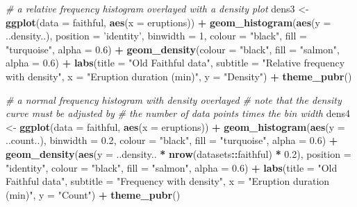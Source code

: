 \documentclass[english,10pt,a4paper,oneside]{book}
\newenvironment{Shaded}{\begin{snugshade}}{\end{snugshade}}
\newcommand{\CommentTok}[1]{\textcolor[rgb]{0.56,0.35,0.01}{\textit{#1}}}
\newcommand{\DataTypeTok}[1]{\textcolor[rgb]{0.13,0.29,0.53}{#1}}
\newcommand{\DecValTok}[1]{\textcolor[rgb]{0.00,0.00,0.81}{#1}}
\newcommand{\FloatTok}[1]{\textcolor[rgb]{0.00,0.00,0.81}{#1}}
\newcommand{\KeywordTok}[1]{\textcolor[rgb]{0.13,0.29,0.53}{\textbf{#1}}}
\newcommand{\NormalTok}[1]{#1}
\newcommand{\OperatorTok}[1]{\textcolor[rgb]{0.81,0.36,0.00}{\textbf{#1}}}
\newcommand{\StringTok}[1]{\textcolor[rgb]{0.31,0.60,0.02}{#1}}
\theoremstyle{definition}
\theoremstyle{definition}
\theoremstyle{definition}
\theoremstyle{remark}
\begin{document}
\begin{Shaded}
\begin{Highlighting}[]
\CommentTok{# a relative frequency histogram overlayed with a density plot}
\NormalTok{dens3 <-}\StringTok{ }\KeywordTok{ggplot}\NormalTok{(}\DataTypeTok{data =}\NormalTok{ faithful, }\KeywordTok{aes}\NormalTok{(}\DataTypeTok{x =}\NormalTok{ eruptions)) }\OperatorTok{+}
\StringTok{  }\KeywordTok{geom_histogram}\NormalTok{(}\KeywordTok{aes}\NormalTok{(}\DataTypeTok{y =}\NormalTok{ ..density..),}
                 \DataTypeTok{position =} \StringTok{'identity'}\NormalTok{, }\DataTypeTok{binwidth =} \DecValTok{1}\NormalTok{,}
                 \DataTypeTok{colour =} \StringTok{"black"}\NormalTok{, }\DataTypeTok{fill =} \StringTok{"turquoise"}\NormalTok{, }\DataTypeTok{alpha =} \FloatTok{0.6}\NormalTok{) }\OperatorTok{+}
\StringTok{  }\KeywordTok{geom_density}\NormalTok{(}\DataTypeTok{colour =} \StringTok{"black"}\NormalTok{, }\DataTypeTok{fill =} \StringTok{"salmon"}\NormalTok{, }\DataTypeTok{alpha =} \FloatTok{0.6}\NormalTok{) }\OperatorTok{+}
\StringTok{  }\KeywordTok{labs}\NormalTok{(}\DataTypeTok{title =} \StringTok{"Old Faithful data"}\NormalTok{,}
       \DataTypeTok{subtitle =} \StringTok{"Relative frequency with density"}\NormalTok{,}
       \DataTypeTok{x =} \StringTok{"Eruption duration (min)"}\NormalTok{,}
       \DataTypeTok{y =} \StringTok{"Density"}\NormalTok{) }\OperatorTok{+}\StringTok{ }\KeywordTok{theme_pubr}\NormalTok{()}

\CommentTok{# a normal frequency histogram with density overlayed}
\CommentTok{# note that the density curve must be adjusted by}
\CommentTok{# the number of data points times the bin width}
\NormalTok{dens4 <-}\StringTok{ }\KeywordTok{ggplot}\NormalTok{(}\DataTypeTok{data =}\NormalTok{ faithful, }\KeywordTok{aes}\NormalTok{(}\DataTypeTok{x =}\NormalTok{ eruptions)) }\OperatorTok{+}
\StringTok{  }\KeywordTok{geom_histogram}\NormalTok{(}\KeywordTok{aes}\NormalTok{(}\DataTypeTok{y =}\NormalTok{ ..count..),}
                 \DataTypeTok{binwidth =} \FloatTok{0.2}\NormalTok{, }\DataTypeTok{colour =} \StringTok{"black"}\NormalTok{, }\DataTypeTok{fill =} \StringTok{"turquoise"}\NormalTok{, }\DataTypeTok{alpha =} \FloatTok{0.6}\NormalTok{) }\OperatorTok{+}
\StringTok{  }\KeywordTok{geom_density}\NormalTok{(}\KeywordTok{aes}\NormalTok{(}\DataTypeTok{y =}\NormalTok{ ..density.. }\OperatorTok{*}\StringTok{ }\KeywordTok{nrow}\NormalTok{(datasets}\OperatorTok{::}\NormalTok{faithful) }\OperatorTok{*}\StringTok{ }\FloatTok{0.2}\NormalTok{), }\DataTypeTok{position =} \StringTok{"identity"}\NormalTok{,}
               \DataTypeTok{colour =} \StringTok{"black"}\NormalTok{, }\DataTypeTok{fill =} \StringTok{"salmon"}\NormalTok{, }\DataTypeTok{alpha =} \FloatTok{0.6}\NormalTok{) }\OperatorTok{+}
\StringTok{  }\KeywordTok{labs}\NormalTok{(}\DataTypeTok{title =} \StringTok{"Old Faithful data"}\NormalTok{,}
       \DataTypeTok{subtitle =} \StringTok{"Frequency with density"}\NormalTok{,}
       \DataTypeTok{x =} \StringTok{"Eruption duration (min)"}\NormalTok{,}
       \DataTypeTok{y =} \StringTok{"Count"}\NormalTok{) }\OperatorTok{+}\StringTok{ }\KeywordTok{theme_pubr}\NormalTok{()}


\end{Highlighting}
\end{Shaded}
\end{document}
